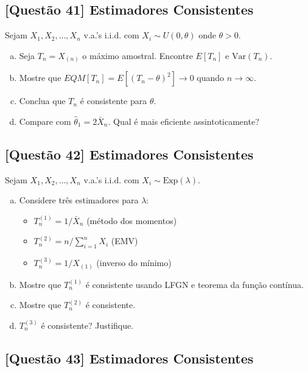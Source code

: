 \documentclass[12pt,a4paper]{article}
\begin{document}
\subsection*{[Questão 41] Estimadores Consistentes}

Sejam $X_1, X_2, \ldots, X_n$ v.a.'s i.i.d. com $X_i \sim U(0, \theta)$ onde $\theta > 0$.

\begin{enumerate}[(a)]
    \item Seja $T_n = X_{(n)}$ o máximo amostral. Encontre $E[T_n]$ e $\text{Var}(T_n)$.
    \item Mostre que $EQM[T_n] = E[(T_n - \theta)^2] \to 0$ quando $n \to \infty$.
    \item Conclua que $T_n$ é consistente para $\theta$.
    \item Compare com $\hat{\theta}_1 = 2\bar{X}_n$. Qual é mais eficiente assintoticamente?
\end{enumerate}

\subsection*{[Questão 42] Estimadores Consistentes}

Sejam $X_1, X_2, \ldots, X_n$ v.a.'s i.i.d. com $X_i \sim \text{Exp}(\lambda)$.

\begin{enumerate}[(a)]
    \item Considere três estimadores para $\lambda$: 
    \begin{itemize}
        \item $T_n^{(1)} = 1/\bar{X}_n$ (método dos momentos)
        \item $T_n^{(2)} = n/\sum_{i=1}^n X_i$ (EMV)
        \item $T_n^{(3)} = 1/X_{(1)}$ (inverso do mínimo)
    \end{itemize}
    \item Mostre que $T_n^{(1)}$ é consistente usando LFGN e teorema da função contínua.
    \item Mostre que $T_n^{(2)}$ é consistente.
    \item $T_n^{(3)}$ é consistente? Justifique.
\end{enumerate}

\subsection*{[Questão 43] Estimadores Consistentes}
\end{document}
